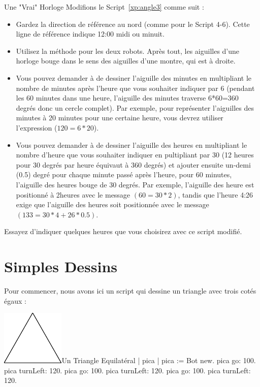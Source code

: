 \documentclass[a4paper,10pt,twoside]{book}
\begin{document}
\begin{exonofigtitle}{Une "Vrai" Horloge}
	Modifions le Script~\ref{xp:angle3} comme suit : 

\begin{itemize} 
	\item Gardez la direction de r\'ef\'erence au nord (comme pour le Script 4-6). Cette ligne de r\'ef\'erence 
	indique 12:00 midi ou minuit. 
	\item  Utilisez la m\'ethode  pour les deux robots. Apr\`es tout, les aiguilles d'une horloge bouge 
	dans le sens des aiguilles d'une montre, qui est \`a droite.
	\item Vous pouvez demander \`a  de dessiner l'aiguille des minutes en multipliant le nombre de minutes 
	apr\`es l'heure que vous souhaiter indiquer par 6 (pendant les 60 minutes dans une heure, l'aiguille des minutes 
	traverse 6*60=360 degr\'es donc un cercle complet). Par exemple, pour repr\'esenter l'aiguilles des minutes \`a 
	20 minutes pour une certaine heure, vous devrez utiliser l'expression  ($120 = 6  * 20$). 
	\item Vous pouvez demander \`a  de dessiner l'aiguille des heures en multipliant le nombre d'heure 
	que vous souhaiter indiquer en pultipliant par 30 (12 heures pour 30 degr\'es par heure \'equivaut \`a 360 degr\'es) 
	et ajouter ensuite un-demi (0.5) degr\'e pour chaque minute pass\'e apr\`es l'heure, pour 60 minutes, l'aiguille des 
	heures bouge de 30 degr\'es. Par exemple, l'aiguille des heure est positionn\'e \`a 2heures avec le message  
	$(60 = 30 * 2)$, tandis que l'heure 4:26 exige que l'aiguille des heures soit positionn\'ee avec le message  
	$(133 = 30 * 4 + 26 * 0.5)$. 
\end{itemize}
Essayez d'indiquer quelques heures que vous choisirez avec ce script modifi\'e.
\end{exonofigtitle}
	
\section{Simples Dessins}

Pour commencer, nous avons ici un script qui dessine un triangle avec trois cot\'es \'egaux :


\begin{scriptfigwithsize}[0.4]{\includegraphics[width=3cm]{ChTurnfirstTriangle}}{Un Triangle Equilat\'eral}\label{xp:triangle}
	| pica | 
	pica := Bot new. 
	pica go: 100. 
	pica turnLeft: 120. 
	pica go: 100. 
	pica turnLeft: 120. 
	pica go: 100. 
	pica turnLeft: 120. 
\end{scriptfigwithsize}
\end{document}
